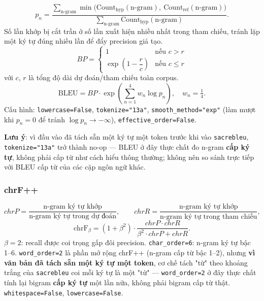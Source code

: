 \begin{equation}
  p_n = \frac{\sum_{\text{n-gram}} \min\bigl(\text{Count}_{\text{hyp}}(\text{n-gram}),\ \text{Count}_{\text{ref}}(\text{n-gram})\bigr)}{\sum_{\text{n-gram}}
\text{Count}_{\text{hyp}}(\text{n-gram})}.
  \label{eq:bleu-precision}
\end{equation}
Số lần khớp bị cắt trần ở số lần xuất hiện nhiều nhất trong tham chiếu, tránh lặp một
ký tự đúng nhiều lần để đẩy precision giả tạo.
\begin{equation}
  BP =
  \begin{cases}
    1 & \text{nếu } c > r \\
    \exp\!\left(1 - \dfrac{r}{c}\right) & \text{nếu } c \le r
  \end{cases}
  \label{eq:bleu-bp}
\end{equation}
với $c$, $r$ là tổng độ dài dự đoán/tham chiếu toàn corpus.
\begin{equation}
  \text{BLEU} = BP \cdot \exp\!\left(\sum_{n=1}^{4} w_n \log p_n\right),\quad w_n=\tfrac14.
  \label{eq:bleu-final}
\end{equation}
Cấu hình: \texttt{lowercase=False}, \texttt{tokenize="13a"}, \texttt{smooth\_method="exp"}
(làm mượt khi $p_n=0$ để tránh $\log p_n \to -\infty$), \texttt{effective\_order=False}.

\textbf{Lưu ý}: vì đầu vào đã tách sẵn một ký tự một token trước khi vào
\texttt{sacrebleu}, \texttt{tokenize="13a"} trở thành no-op — BLEU ở đây thực chất đo
n-gram \textbf{cấp ký tự}, không phải cấp từ như cách hiểu thông thường; không nên so
sánh trực tiếp với BLEU cấp từ của các cặp ngôn ngữ khác.

\subsubsection{chrF++}

\begin{equation}
  chrP = \frac{\text{n-gram ký tự khớp}}{\text{n-gram ký tự trong dự đoán}}, \qquad
  chrR = \frac{\text{n-gram ký tự khớp}}{\text{n-gram ký tự trong tham chiếu}},
  \label{eq:chrf-pr}
\end{equation}
\begin{equation}
  \text{chrF}_\beta = (1+\beta^2)\cdot \frac{chrP \cdot chrR}{\beta^2 \cdot chrP + chrR}.
  \label{eq:chrf-final}
\end{equation}
$\beta=2$: recall được coi trọng gấp đôi precision. \texttt{char\_order=6}: n-gram ký tự
bậc 1--6. \texttt{word\_order=2} là phần mở rộng chrF++ (n-gram cấp từ bậc 1--2), nhưng
\textbf{vì văn bản đã tách sẵn một ký tự một token}, cơ chế tách "từ" theo khoảng trắng
của \texttt{sacrebleu} coi mỗi ký tự là một "từ" — \texttt{word\_order=2} ở đây thực chất
tính lại bigram \textbf{cấp ký tự} một lần nữa, không phải bigram cấp từ thật.
\texttt{whitespace=False}, \texttt{lowercase=False}.

